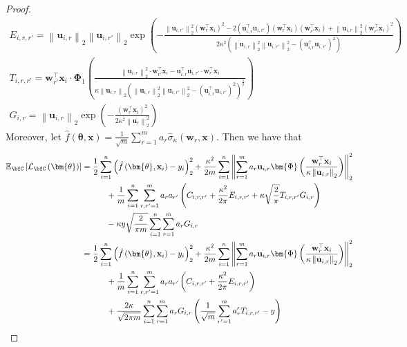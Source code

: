 \documentclass[10pt]{article} %
\theoremstyle{definition}
\theoremstyle{plain}
\newcommand{\paren}[1]{\left(#1\right)}
\newcommand{\norm}[1]{\left\|#1\right\|}
\newcommand{\act}[2]{\hat{\sigma}_{\kappa}\paren{#1,#2}}
\providecommand{\E}{\mathbb{E}}
\def\calL{{\mathcal{L}}}
\def\bfu{{\mathbf{u}}}\def\bfv{{\mathbf{v}}}\def\bfw{{\mathbf{w}}}\def\bfx{{\mathbf{x}}}
\begin{document}
\begin{proof}
\begin{gather*}
        E_{i,r,r'} = \norm{\bfu_{i,r}}_2\norm{\bfu_{i,r'}}_2\exp\paren{-\frac{\norm{\bfu_{i,r'}}_2^2\paren{\bfw_r^\top\bfx_i}^2-2\paren{\bfu_{i,r}^\top\bfu_{i,r'}}\paren{\bfw_r^\top\bfx_i}\paren{\bfw_{r'}^\top\bfx_i} + \norm{\bfu_{i,r}}_2^2\paren{\bfw_{r'}^\top\bfx_i}^2}{2\kappa^2\paren{\norm{\bfu_{i,r}}_2^2\norm{\bfu_{i,r'}}_2^2-\paren{\bfu_{i,r}^\top\bfu_{i,r'}}^2}}}\\
        T_{i,r,r'} = \bfw_{r'}^\top\bfx_i\cdot \bm{\Phi}_1\paren{\frac{\norm{\bfu_{i,r}}_2^2\cdot\bfw_{r'}^\top\bfx_i-\bfu_{i,r}^\top\bfu_{i,r'}\cdot\bfw_r^\top\bfx_i}{\kappa\norm{\bfu_{i,r}}_2\paren{\norm{\bfu_{i,r}}_2^2\norm{\bfu_{i,r'}}_2^2-\paren{\bfu_{i,r}^\top\bfu_{i,r'}}^2}^{\frac{1}{2}}}}\\
        G_{i,r} = \norm{\bfu_{i,r}}_2\exp\paren{-\frac{\paren{\bfw_r^\top\bfx_i}^2}{2\kappa^2\norm{\bfu_r}_2^2}}
    \end{gather*}
    Moreover, let $\hat{f}\paren{\bm{\theta},\bfx} = \frac{1}{\sqrt{m}}\sum_{r=1}^ma_r\act{\bfw_r}{\bfx}$. Then we have that
    \begin{align*}
        \E_{\bfC}\left[\calL_{\bfC}\paren{\bm{\theta}}\right] & = \frac{1}{2}\sum_{i=1}^n\paren{\hat{f}\paren{\bm{\theta},\bfx_i}-y_i}_2^2 + \frac{\kappa^2}{2m}\sum_{i=1}^n\norm{\sum_{r=1}^ma_r\bfu_{i,r}\bm{\Phi}\paren{\frac{\bfw_r^\top\bfx_i}{\kappa\norm{\bfu_{i,r}}_2}}}_2^2\\
        & \quad\quad\quad + \frac{1}{m}\sum_{i=1}^n\sum_{r,r'=1}^ma_ra_{r'}\paren{C_{i,r,r'} + \frac{\kappa^2}{2\pi}E_{i,r,r'} + \kappa\sqrt{\frac{2}{\pi}}T_{i,r,r'}G_{i,r}}\\
        & \quad\quad\quad - \kappa y\sqrt{\frac{2}{\pi m}}\sum_{i=1}^n\sum_{r=1}^ma_rG_{i,r}\\
        & = \frac{1}{2}\sum_{i=1}^n\paren{\hat{f}\paren{\bm{\theta},\bfx_i}-y_i}_2^2 + \frac{\kappa^2}{2m}\sum_{i=1}^n\norm{\sum_{r=1}^ma_r\bfu_{i,r}\bm{\Phi}\paren{\frac{\bfw_r^\top\bfx_i}{\kappa\norm{\bfu_{i,r}}_2}}}_2^2\\
        & \quad\quad\quad + \frac{1}{m}\sum_{i=1}^n\sum_{r,r'=1}^ma_ra_{r'}\paren{C_{i,r,r'} + \frac{\kappa^2}{2\pi}E_{i,r,r'}}\\
        & \quad\quad\quad + \frac{2\kappa}{\sqrt{2\pi m}}\sum_{i=1}^n\sum_{r=1}^ma_rG_{i,r}\paren{\frac{1}{\sqrt{m}}\sum_{r'=1}^ma_r'T_{i,r,r'} - y}
    \end{align*}
\end{proof}
\end{document}
